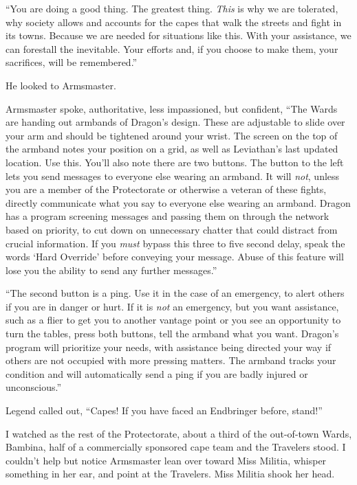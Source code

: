 ``You are doing a good thing.  The greatest thing.  \emph{This} is why we are tolerated, why society allows and accounts for the capes that walk the streets and fight in its towns.  Because we are needed for situations like this.  With your assistance, we can forestall the inevitable.  Your efforts and, if you choose to make them, your sacrifices, will be remembered.''



He looked to Armsmaster.



Armsmaster spoke, authoritative, less impassioned, but confident, ``The Wards are handing out armbands of Dragon's design.  These are adjustable to slide over your arm and should be tightened around your wrist.  The screen on the top of the armband notes your position on a grid, as well as Leviathan's last updated location.  Use this.  You'll also note there are two buttons.  The button to the left lets you send messages to everyone else wearing an armband.  It will \emph{not}, unless you are a member of the Protectorate or otherwise a veteran of these fights, directly communicate what you say to everyone else wearing an armband.  Dragon has a program screening messages and passing them on through the network based on priority, to cut down on unnecessary chatter that could distract from crucial information.  If you \emph{must} bypass this three to five second delay, speak the words `Hard Override' before conveying your message.  Abuse of this feature will lose you the ability to send any further messages.''



``The second button is a ping.  Use it in the case of an emergency, to alert others if you are in danger or hurt.  If it is \emph{not} an emergency, but you want assistance, such as a flier to get you to another vantage point or you see an opportunity to turn the tables, press both buttons, tell the armband what you want.  Dragon's program will prioritize your needs, with assistance being directed your way if others are not occupied with more pressing matters.  The armband tracks your condition and will automatically send a ping if you are badly injured or unconscious.''



Legend called out, ``Capes!  If you have faced an Endbringer before, stand!''



I watched as the rest of the Protectorate, about a third of the out-of-town Wards, Bambina, half of a commercially sponsored cape team and the Travelers stood.  I couldn't help but notice Armsmaster lean over toward Miss Militia, whisper something in her ear, and point at the Travelers.  Miss Militia shook her head.



